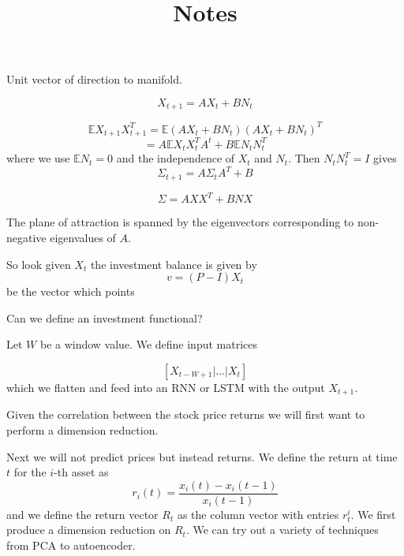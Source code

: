\documentclass[11pt]{article}
\numberwithin{equation}{section}
\numberwithin{equation}{section}
\newcommand\E{\mathbb{E}}
\theoremstyle{remark}
\begin{document}
	
	
	
	
	
	
	
	\title{Notes}
	\date{}
	
	
	\maketitle 
	
	
	Unit vector of direction to manifold. 
	
	\[ X_{t+1} = A X_t + BN_{t}\]
	 
		\[ \E X_{t+1}X_{t+1}^T  = \E( A X_t + BN_{t} ) ( A X_t + BN_{t} )^T \]
 \[  =  A \E X_tX_t^T A^t  + B\E N_{t}N_{t}^T   \]
 where we use $\E N_t = 0$ and the independence of $X_t$ and $N_t$. Then $N_{t}N_{t}^T  = I$ gives 
	$$ \Sigma_{t+1} = A \Sigma_t A^T + B $$ 

 
		\[\Sigma= AXX^T + B N X  \]
	
	
	The plane of attraction is spanned by the eigenvectors corresponding to non-negative eigenvalues of $A$. 
	
	So look given $X_{t}$ the investment balance is given by
	 $$v = (P-I) X_{t}$$ be the vector which points
	
	Can we define an investment functional?  
	
	Let $W$ be a window value. We define input matrices 
	
	$$ [X_{t-W+1}| \hdots | X_{t} ] $$
	which we flatten and feed into an RNN or LSTM with the output $X_{t+1}$.  
	
	Given the correlation between the stock price returns we will first want to perform a dimension reduction.
	
	
	Next we will not predict prices but instead returns. We define the return at time $t$ for the $i$-th asset as
	$$ r_i(t) = \dfrac{x_{i}(t)-x_{i}(t-1)}{x_i(t-1)} $$
	and we define the return vector $R_t$ as the column vector with entries $r_{t}^i$. We first produce a dimension reduction on $R_t$. We can try out a variety of techniques from PCA to autoencoder. 
	
	
	
	
\end{document}
